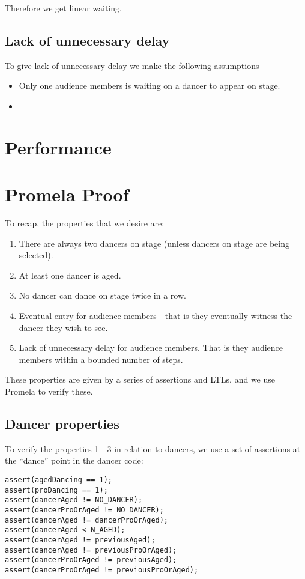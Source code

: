 \documentclass[12pt,a4paper]{scrartcl}
\begin{document}
Therefore we get linear waiting.

\subsection{Lack of unnecessary delay}
To give lack of unnecessary delay we make the following assumptions
\begin{itemize}
    \item Only one audience members is waiting on a dancer to appear on stage.
    \item 
\end{itemize}

\section{Performance}

\section{Promela Proof}
To recap, the properties that we desire are:
\begin{enumerate}
    \item There are always two dancers on stage (unless dancers on stage are being selected).
    \item At least one dancer is aged.
    \item No dancer can dance on stage twice in a row.
    \item Eventual entry for audience members - that is they eventually witness the dancer they wish to see.
    \item Lack of unnecessary delay for audience members.
          That is they audience members within a bounded number of steps.
\end{enumerate}

These properties are given by a series of assertions and LTLs, and we use Promela to verify these.

\subsection{Dancer properties}
To verify the properties 1 - 3 in relation to dancers, we use a set of assertions at the ``dance'' point in the dancer code:
\begin{lstlisting}
assert(agedDancing == 1);
assert(proDancing == 1);
assert(dancerAged != NO_DANCER);
assert(dancerProOrAged != NO_DANCER);
assert(dancerAged != dancerProOrAged);
assert(dancerAged < N_AGED);
assert(dancerAged != previousAged);
assert(dancerAged != previousProOrAged);
assert(dancerProOrAged != previousAged);
assert(dancerProOrAged != previousProOrAged);
\end{lstlisting}
\end{document}
